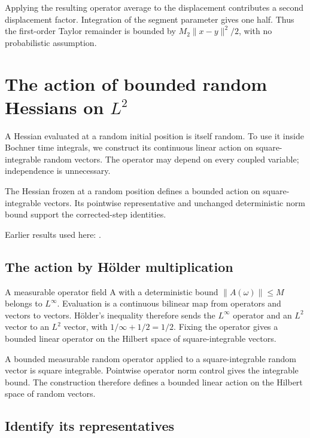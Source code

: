 \documentclass[11pt,a4paper]{report}
\begin{document}
Applying the resulting operator average to the displacement contributes a second displacement factor. Integration of the segment parameter gives one half. Thus the first-order Taylor remainder is bounded by \(M_2\|x-y\|^2/2\), with no probabilistic assumption.

\section{\texorpdfstring{The action of bounded random Hessians on \(L^{2}\)}{The action of bounded random Hessians on L²}}
\label{proof-module-KineticLangevin-RandomOperatorLp-lean}


A Hessian evaluated at a random initial position is itself random. To use it inside Bochner time integrals, we construct its continuous linear action on square-integrable random vectors. The operator may depend on every coupled variable; independence is unnecessary.



The Hessian frozen at a random position defines a bounded action on square-integrable vectors. Its pointwise representative and unchanged deterministic norm bound support the corrected-step identities.



Earlier results used here: \cite[Section~3.13]{LangevinLean2026ULASC}.
\subsection{\texorpdfstring{The action by Hölder multiplication}{The action by Hölder multiplication}}
\label{report-step-KineticLangevin-RandomOperatorLp-lean-1}


A measurable operator field A with a deterministic bound \(\|A(\omega )\|\le M\) belongs to \(L^\infty\). Evaluation is a continuous bilinear map from operators and vectors to vectors. Hölder’s inequality therefore sends the \(L^\infty\) operator and an \(L^{2}\) vector to an \(L^{2}\) vector, with \(1/\infty+1/2=1/2\). Fixing the operator gives a bounded linear operator on the Hilbert space of square-integrable vectors.



A bounded measurable random operator applied to a square-integrable random vector is square integrable. Pointwise operator norm control gives the integrable bound. The construction therefore defines a bounded linear action on the Hilbert space of random vectors.

\subsection{\texorpdfstring{Identify its representatives}{Identify its representatives}}
\label{report-step-KineticLangevin-RandomOperatorLp-lean-2}
\end{document}
